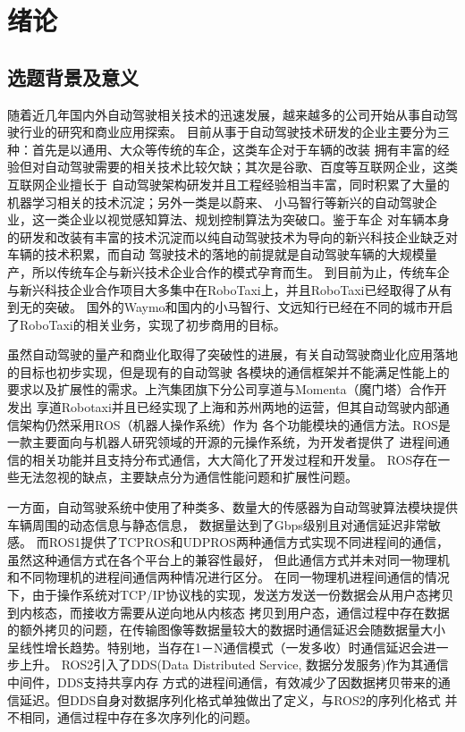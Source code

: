 \chapter{绪论}
\section{选题背景及意义}
随着近几年国内外自动驾驶相关技术的迅速发展，越来越多的公司开始从事自动驾驶行业的研究和商业应用探索\cite{qiuwei}。
目前从事于自动驾驶技术研发的企业主要分为三种：首先是以通用、大众等传统的车企，这类车企对于车辆的改装
拥有丰富的经验但对自动驾驶需要的相关技术比较欠缺；其次是谷歌、百度等互联网企业，这类互联网企业擅长于
自动驾驶架构研发并且工程经验相当丰富，同时积累了大量的机器学习相关的技术沉淀；另外一类是以蔚来、
小马智行等新兴的自动驾驶企业，这一类企业以视觉感知算法、规划控制算法为突破口\cite{xiaoxi}。鉴于车企
对车辆本身的研发和改装有丰富的技术沉淀而以纯自动驾驶技术为导向的新兴科技企业缺乏对车辆的技术积累，而自动
驾驶技术的落地的前提就是自动驾驶车辆的大规模量产，所以传统车企与新兴技术企业合作的模式孕育而生\cite{yty}。
到目前为止，传统车企与新兴科技企业合作项目大多集中在RoboTaxi上，并且RoboTaxi已经取得了从有到无的突破。
国外的Waymo和国内的小马智行、文远知行已经在不同的城市开启了RoboTaxi的相关业务，实现了初步商用的目标\cite{xmh}。

虽然自动驾驶的量产和商业化取得了突破性的进展，有关自动驾驶商业化应用落地的目标也初步实现，但是现有的自动驾驶
各模块的通信框架并不能满足性能上的要求以及扩展性的需求。上汽集团旗下分公司享道与Momenta（魔门塔）合作开发出
享道Robotaxi并且已经实现了上海和苏州两地的运营，但其自动驾驶内部通信架构仍然采用ROS（机器人操作系统）作为
各个功能模块的通信方法\cite{zzq}。ROS是一款主要面向与机器人研究领域的开源的元操作系统，为开发者提供了
进程间通信的相关功能并且支持分布式通信，大大简化了开发过程和开发量。
ROS存在一些无法忽视的缺点，主要缺点分为通信性能问题和扩展性问题\cite{9545285}。

一方面，自动驾驶系统中使用了种类多、数量大的传感器为自动驾驶算法模块提供车辆周围的动态信息与静态信息，
数据量达到了Gbps级别且对通信延迟非常敏感。
而ROS1提供了TCPROS和UDPROS两种通信方式实现不同进程间的通信，虽然这种通信方式在各个平台上的兼容性最好，
但此通信方式并未对同一物理机和不同物理机的进程间通信两种情况进行区分。
在同一物理机进程间通信的情况下，由于操作系统对TCP/IP协议栈的实现，发送方发送一份数据会从用户态拷贝到内核态，而接收方需要从逆向地从内核态
拷贝到用户态，通信过程中存在数据的额外拷贝的问题，在传输图像等数据量较大的数据时通信延迟会随数据量大小
呈线性增长趋势。特别地，当存在1－N通信模式（一发多收）时通信延迟会进一步上升\cite{9591166,Maruyama2016ExploringTP}。
ROS2引入了DDS(Data Distributed Service, 数据分发服务)作为其通信中间件\cite{8607261}，DDS支持共享内存
方式的进程间通信，有效减少了因数据拷贝带来的通信延迟。但DDS自身对数据序列化格式单独做出了定义，与ROS2的序列化格式
并不相同，通信过程中存在多次序列化的问题\cite{Maruyama2016ExploringTP}。

